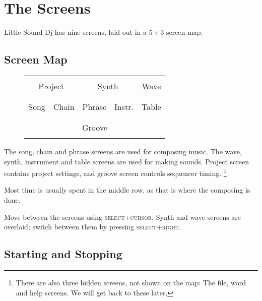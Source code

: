 \chapter{The Screens}
Little Sound Dj has nine screens, laid out in a \begin{math} 5 \times 3 \end{math} screen map.

\section{Screen Map}

\begin{figure}[htbp]
\centering
\begin{tabular}{|c|c|c|c|c|}
	\cline{0-4}
	\multicolumn{2}{|c|}{} & \multicolumn{2}{|c|}{} & \\
	\multicolumn{2}{|c|}{Project} & \multicolumn{2}{|c|}{Synth} & Wave \\
	\multicolumn{2}{|c|}{} & \multicolumn{2}{|c|}{}  &\\
        \cline{0-4}
        & & & & \\
        Song & Chain & Phrase & Instr. & Table \\
        & & & & \\
        \cline{0-4}
        \multicolumn{5}{|c|}{} \\
        \multicolumn{5}{|c|}{Groove} \\
        \multicolumn{5}{|c|}{} \\
        \cline{0-4}
\end{tabular}
\end{figure}

The song, chain and phrase screens are used for composing music. The wave, synth,
instrument and table screens are used for making sounds.
Project screen contains project settings, and groove screen controls sequencer timing.
\footnote{There are also three hidden
screens, not shown on the map: The file, word and help screens. We will get back to these later.}

Most time is usually spent in the middle row, as that is where the composing is done.

Move between the screens using \textsc{select+cursor}. Synth and wave screens are overlaid; switch between them by pressing \textsc{select+right}.

\section{Starting and Stopping}

